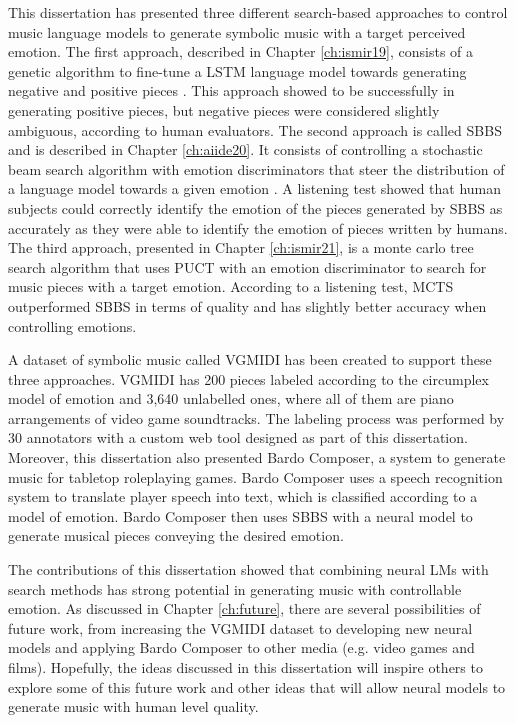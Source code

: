 This dissertation has presented three different search-based approaches to control music language models to generate symbolic music with a target perceived emotion. The first approach, described in Chapter \ref{ch:ismir19}, consists of a genetic algorithm to fine-tune a LSTM language model towards generating negative and positive pieces \cite{ferreira_2019}. This approach showed to be successfully in generating positive pieces, but negative pieces were considered slightly ambiguous, according to human evaluators. The second approach is called SBBS and is described in Chapter \ref{ch:aiide20}. It consists of controlling a stochastic beam search algorithm with emotion discriminators that steer the distribution of a language model towards a given emotion \cite{ferreira2020computer}.
A listening test showed that human subjects could correctly identify the emotion of the pieces generated by SBBS as accurately as they were able to identify the emotion of pieces written by humans. The third approach, presented in Chapter \ref{ch:ismir21}, is a monte carlo tree search algorithm that uses PUCT with an emotion discriminator to search for music pieces with a target emotion. According to a listening test, MCTS outperformed SBBS in terms of quality and has slightly better accuracy when controlling emotions.

A dataset of symbolic music called VGMIDI has been created to support these three approaches. VGMIDI has 200  pieces labeled according to the circumplex model of emotion \cite{russell1980circumplex} and 3,640 unlabelled ones, where all of them are piano arrangements of video game soundtracks. The labeling process was performed by 30 annotators with a custom web tool designed as part of this dissertation. Moreover, this dissertation also presented Bardo Composer, a system to generate music for tabletop roleplaying games. Bardo Composer uses a speech recognition system to translate player speech into text, which is classified according to a model of emotion. Bardo Composer then uses SBBS with a neural model to generate musical pieces conveying the desired emotion.

The contributions of this dissertation showed that combining neural LMs with search methods has strong potential in generating music with controllable emotion. As discussed in Chapter \ref{ch:future}, there are several possibilities of future work, from increasing the VGMIDI dataset to developing new neural models and applying Bardo Composer to other media (e.g. video games and films). Hopefully, the ideas discussed in this dissertation will inspire others to explore some of this future work and other ideas that will allow neural models to generate music with human level quality.
